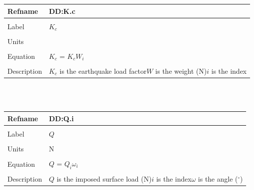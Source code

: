 \documentclass[12pt]{article}
\begin{document}
\noindent \begin{minipage}{\textwidth}
\begin{tabular}{p{} p{}}
\toprule \textbf{Refname} & \textbf{DD:K.c}
\label{DD:K.c}
\\ \midrule \\
Label & $K_{c}$
\\ \midrule \\
Units & 
\\ \midrule \\
Equation & $K_{c}$ = $K_{c}W_{i}$
\\ \midrule \\
Description & $K_{c}$ is the earthquake load factor\newline$W$ is the weight (N)\newline$i$ is the index
\\ \bottomrule \end{tabular}
\end{minipage}\\
~\newline
\noindent \begin{minipage}{\textwidth}
\begin{tabular}{p{} p{}}
\toprule \textbf{Refname} & \textbf{DD:Q.i}
\label{DD:Q.i}
\\ \midrule \\
Label & $Q$
\\ \midrule \\
Units & N
\\ \midrule \\
Equation & $Q$ = $Q_{i}\omega{}_{i}$
\\ \midrule \\
Description & $Q$ is the imposed surface load (N)\newline$i$ is the index\newline$\omega{}$ is the angle (${}^{\circ}$)
\\ \bottomrule \end{tabular}
\end{minipage}\\
~\newline
\end{document}
